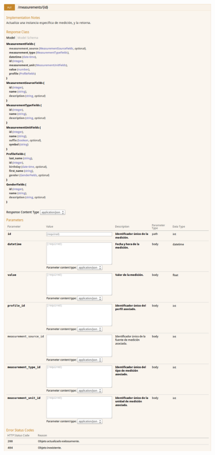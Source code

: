\begin{figure}[h]
  \centering
  \includegraphics[width=\textwidth,height=.75\textheight,keepaspectratio]{img/especificacion_api/measurementView_put}
  \label{measurementView_put}
\end{figure}

